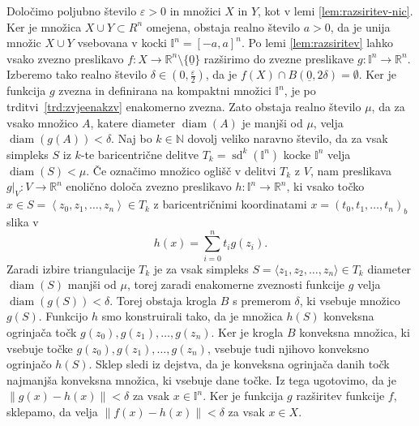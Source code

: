 \documentclass[mat1]{fmfdelo}
\newcommand{\R}{\mathbb R}
\newcommand{\N}{\mathbb N}
\DeclareMathOperator{\diam}{diam}
\DeclareMathOperator{\sd}{sd}
\newcommand{\I}{\mathbb I}
\newcommand{\0}{\underline{0}}
\begin{document}
\begin{dokaz}
Določimo poljubno število $\varepsilon > 0$ in množici $X$ in $Y$, kot v lemi \ref{lem:razsiritev-nic}. Ker je množica $X \cup Y \subset R^n$ omejena, obstaja realno število $a > 0$, da je unija množic $X \cup Y$ vsebovana v kocki $\I^n = \left [ -a, a \right ]^n$. Po lemi \ref{lem:razsiritev} lahko vsako zvezno preslikavo $f : X \to \R^n \setminus \{ \0 \}$ razširimo do zvezne preslikave $g : \I^n \to \R^n$. Izberemo tako realno število $\delta \in (0, \frac{\varepsilon}{2})$, da je $f(X) \cap B( \0, 2\delta) = \emptyset$. Ker je funkcija $g$ zvezna in definirana na kompaktni množici $\I^n$, je po trditvi~\ref{trd:zvjeenakzv} enakomerno zvezna. Zato obstaja realno število $\mu$, da za vsako množico $A$, katere diameter $\diam(A)$ je manjši od $\mu$, velja $\diam(g(A)) < \delta$. Naj bo $k \in \N$ dovolj veliko naravno število, da za vsak simpleks $S$ iz $k$-te baricentrične delitve $T_k = \sd^k(\I^n)$ kocke $\I^n$ velja $\diam(S) < \mu$. Če označimo množico oglišč v delitvi $T_k$ z $V$, nam preslikava $g|_V : V \to \R^n$ enolično določa zvezno preslikavo $h : \I^n \to \R^n$, ki vsako točko $x \in S = \left < z_0, z_1, \dots, z_n \right > \in T_k$ z baricentričnimi koordinatami $x = (t_0, t_1, \dots, t_n)_b$ slika v 
$$h(x) = \sum_{i=0}^n t_i g(z_i).$$
Zaradi izbire triangulacije $T_k$ je za vsak simpleks $S = \langle  z_1, z_2, \dots, z_n \rangle \in T_k$ diameter $\diam(S)$ manjši od $\mu$, torej zaradi enakomerne zveznosti funkcije $g$ velja $\diam (g(S)) < \delta$. Torej obstaja krogla $B$ s premerom $\delta$, ki vsebuje množico $g(S)$. Funkcijo $h$ smo konstruirali tako, da je množica $h(S)$ konveksna ogrinjača točk $g(z_0), g(z_1), \dots, g(z_n)$. Ker je krogla $B$ konveksna množica, ki vsebuje točke $g(z_0), g(z_1), \dots, g(z_n)$, vsebuje tudi njihovo konveksno ogrinjačo $h(S)$. Sklep sledi iz dejstva, da je konveksna ogrinjača danih točk najmanjša konveksna množica, ki vsebuje dane točke. Iz tega ugotovimo, da je $\| g(x) - h(x) \| < \delta$ za vsak $x \in \I^n$. Ker je funkcija $g$ razširitev funkcije $f$, sklepamo, da velja $\| f(x) - h(x) \| < \delta$ za vsak $x \in X$.


\end{dokaz}
\end{document}
